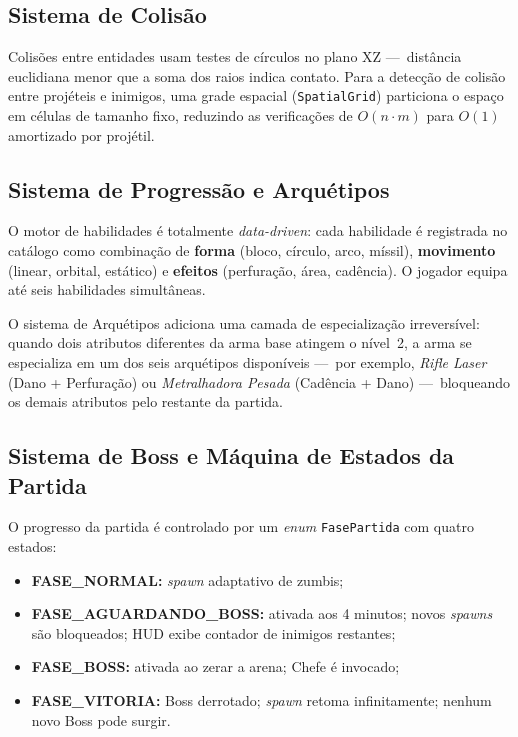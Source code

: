 \documentclass[12pt,a4paper]{article}
\begin{document}
\subsection{Sistema de Colisão}

Colisões entre entidades usam testes de círculos no plano XZ —\ distância
euclidiana menor que a soma dos raios indica contato.
Para a detecção de colisão entre projéteis e inimigos, uma grade espacial
(\texttt{SpatialGrid}) particiona o espaço em células de tamanho fixo,
reduzindo as verificações de $O(n \cdot m)$ para $O(1)$ amortizado por
projétil.

\subsection{Sistema de Progressão e Arquétipos}

O motor de habilidades é totalmente \textit{data-driven}: cada habilidade
é registrada no catálogo como combinação de \textbf{forma} (bloco, círculo,
arco, míssil), \textbf{movimento} (linear, orbital, estático) e
\textbf{efeitos} (perfuração, área, cadência).
O jogador equipa até seis habilidades simultâneas.

O sistema de Arquétipos adiciona uma camada de especialização irreversível:
quando dois atributos diferentes da arma base atingem o nível~2, a arma
se especializa em um dos seis arquétipos disponíveis —\ por exemplo,
\textit{Rifle Laser} (Dano + Perfuração) ou
\textit{Metralhadora Pesada} (Cadência + Dano) —\ bloqueando os demais
atributos pelo restante da partida.

\subsection{Sistema de Boss e Máquina de Estados da Partida}

O progresso da partida é controlado por um \textit{enum} \texttt{FasePartida}
com quatro estados:

\begin{itemize}
    \item \textbf{FASE\_NORMAL:} \textit{spawn} adaptativo de zumbis;
    \item \textbf{FASE\_AGUARDANDO\_BOSS:} ativada aos 4 minutos; novos
          \textit{spawns} são bloqueados; HUD exibe contador de inimigos
          restantes;
    \item \textbf{FASE\_BOSS:} ativada ao zerar a arena; Chefe é invocado;
    \item \textbf{FASE\_VITORIA:} Boss derrotado; \textit{spawn} retoma
          infinitamente; nenhum novo Boss pode surgir.
\end{itemize}
\end{document}
